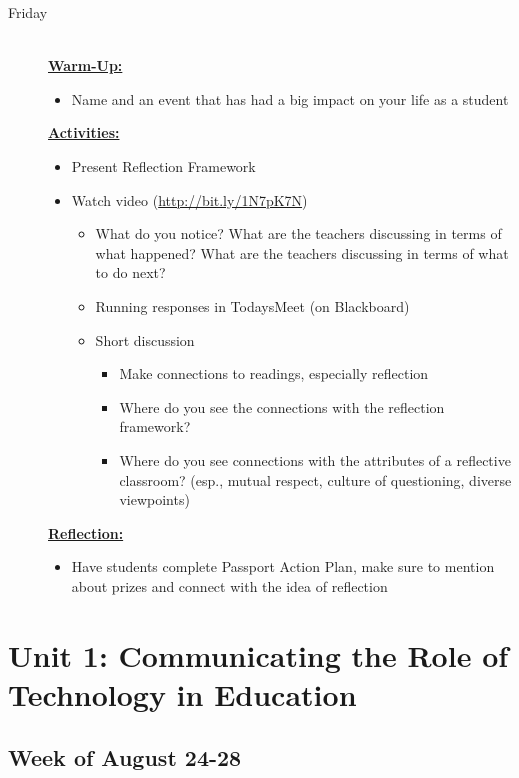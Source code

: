 \documentclass{tufte-handout}
\newcommand{\weektwo}{August 24-28}
\newcommand{\listfri}{\item[Friday] \hfill \\}
\newenvironment{daywu}
	{\textbf{\underline{Warm-Up:}} \hfill \\
	\begin{itemize}}
	{\end{itemize}}
\newenvironment{dayact}
	{\textbf{\underline{Activities:}} \hfill \\
	\begin{itemize}}
	{\end{itemize}}
\newenvironment{dayref}
	{\textbf{\underline{Reflection:}} \hfill \\
	\begin{itemize}}
	{\end{itemize}}
\newenvironment{weeksched}
	{\noindent
	\begin{description}}
	{\end{description}
	\newpage}
\begin{document}
\begin{fullwidth}
\begin{weeksched}
\listfri
\begin{daywu}
	\item Name and an event that has had a big impact on your life as a student
\end{daywu}
\begin{dayact}
	\item Present Reflection Framework
	\item Watch video (\url{http://bit.ly/1N7pK7N})
	\begin{itemize}
		\item What do you notice? What are the teachers discussing in terms of what happened? What are the teachers discussing in terms of what to do next?
		\item Running responses in TodaysMeet (on Blackboard)
		\item Short discussion
		\begin{itemize}
			\item Make connections to readings, especially reflection
			\item Where do you see the connections with the reflection framework?
			\item Where do you see connections with the attributes of a reflective classroom? (esp., mutual respect, culture of questioning, diverse viewpoints)
		\end{itemize}
	\end{itemize}
\end{dayact}
\begin{dayref}
	\item Have students complete Passport Action Plan, make sure to mention about prizes and connect with the idea of reflection
\end{dayref}
\end{weeksched}

\section{Unit 1: Communicating the Role of Technology in Education}

\subsection{Week of \weektwo}


\end{fullwidth}
\end{document}
